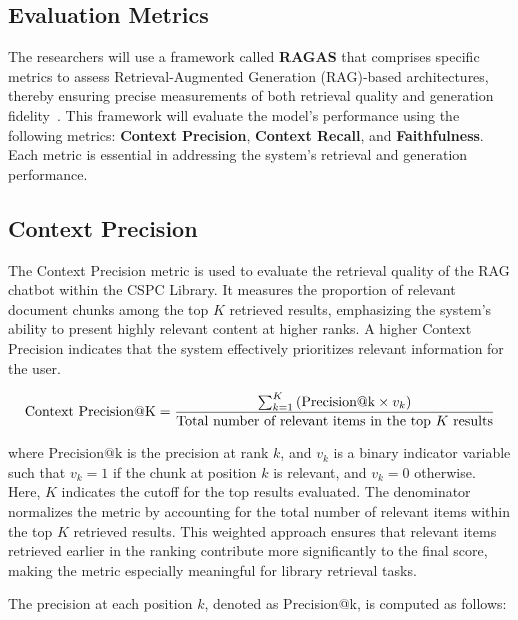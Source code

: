 \begin{refsection}
\section{Evaluation Metrics}

\hspace{0.4cm}The researchers will use a framework called \textbf{RAGAS} that comprises specific metrics to assess Retrieval-Augmented Generation (RAG)-based architectures, thereby ensuring precise measurements of both retrieval quality and generation fidelity~\cite{oubah2024advanced}. This framework will evaluate the model's performance using the following metrics: \textbf{Context Precision}, \textbf{Context Recall}, and \textbf{Faithfulness}. Each metric is essential in addressing the system’s retrieval and generation performance.

\subsection*{Context Precision}

The Context Precision metric is used to evaluate the retrieval quality of the RAG chatbot within the CSPC Library. It measures the proportion of relevant document chunks among the top $K$ retrieved results, emphasizing the system's ability to present highly relevant content at higher ranks. A higher Context Precision indicates that the system effectively prioritizes relevant information for the user.

\begin{equation}
\centering
\text{Context Precision@K} = 
\frac{
    \sum_{k=1}^{K} \left( \text{Precision@k} \times v_k \right)
}{
    \text{Total number of relevant items in the top } K \text{ results}
}
\end{equation}

where $\text{Precision@k}$ is the precision at rank $k$, and $v_k$ is a binary indicator variable such that $v_k = 1$ if the chunk at position $k$ is relevant, and $v_k = 0$ otherwise. Here, $K$ indicates the cutoff for the top results evaluated. The denominator normalizes the metric by accounting for the total number of relevant items within the top $K$ retrieved results. This weighted approach ensures that relevant items retrieved earlier in the ranking contribute more significantly to the final score, making the metric especially meaningful for library retrieval tasks.

The precision at each position $k$, denoted as Precision@k, is computed as follows:


\end{refsection}
